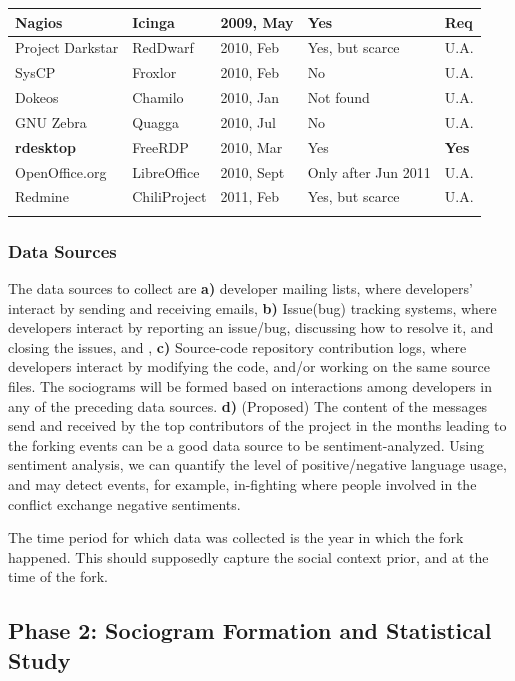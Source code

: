 \documentclass{report}
\begin{document}
\begin{table} [H]
\begin{tabular}{m{} m{} m{} m{} m{}}
Nagios & Icinga & 2009, May & Yes & Req \\ \hline
Project Darkstar& RedDwarf & 2010, Feb & Yes, but scarce & U.A. \\ \hline
SysCP & Froxlor & 2010, Feb & No & U.A. \\ \hline
Dokeos & Chamilo & 2010, Jan & Not found & U.A. \\ \hline
GNU Zebra & Quagga & 2010, Jul & No & U.A. \\ \hline
\textbf{rdesktop} & FreeRDP & 2010, Mar & Yes & \textbf{Yes} \\ \hline
OpenOffice.org & LibreOffice & 2010, Sept & Only after Jun 2011 & U.A. \\ \hline
Redmine & ChiliProject & 2011, Feb & Yes, but scarce & U.A. \\
\noalign{\smallskip}\hline
\end{tabular}
\end{table}

\subsubsection{Data Sources}
The data sources to collect are \textbf{a)} developer mailing lists, where developers' interact by sending and receiving emails, \textbf{b)} Issue(bug) tracking systems, where developers interact by reporting an issue/bug, discussing how to resolve it, and closing the issues, and , \textbf{c)} Source-code repository contribution logs, where developers interact by modifying the code, and/or working on the same source files. The sociograms will be formed based on interactions among developers in any of the preceding data sources. \textbf{d)} (Proposed) The content of the messages send and received by the top contributors of the project in the months leading to the forking events can be a good data source to be sentiment-analyzed. Using sentiment analysis, we can quantify the level of positive/negative language usage, and may detect events, for example, in-fighting where people involved in the conflict exchange negative sentiments.

The time period for which data was collected is the year in which the fork happened. This should supposedly capture the social context prior, and at the time of the fork.

\subsection{Phase 2: Sociogram Formation and Statistical Study}
\end{document}
